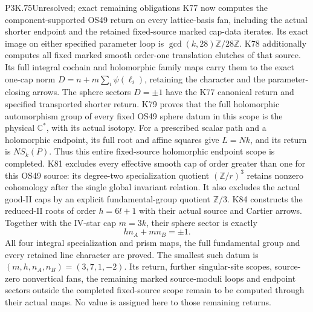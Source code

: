 \begin{statement}{P3K.75}{Unresolved; exact remaining obligations}
K77 now computes the component-supported OS49 return on every
lattice-basis fan, including the actual shorter endpoint and
the retained fixed-source marked cap-data iterates. Its exact
image on either specified parameter loop is
\(\gcd(k,28)\mathbb Z/28\mathbb Z\).
K78 additionally computes all fixed marked smooth order-one
translation clutches of that source. Its full integral cochain
and holomorphic family maps carry them to the exact one-cap norm
\(D=n+m\sum_i\psi(\ell_i)\), retaining the character and the
parameter-closing arrows. The sphere sectors \(D=\pm1\) have the
K77 canonical return and specified transported shorter return.
K79 proves that the full holomorphic automorphism group of every
fixed OS49 sphere datum in this scope is the physical
\(\mathbb C^*\), with its actual isotopy. For a prescribed scalar
path and a holomorphic endpoint, its full root and affine squares
give \(L=Nk\), and its return is \(N S_k(P)\). Thus this entire
fixed-source holomorphic endpoint scope is completed.
K81 excludes every effective smooth cap of order greater than
one for this OS49 source: its degree-two specialization quotient
\((\mathbb Z/r)^3\) retains nonzero cohomology after the single
global invariant relation. It also excludes the actual good-II
caps by an explicit fundamental-group quotient \(\mathbb Z/3\).
K84 constructs the reduced-II roots of order \(h=6l+1\)
with their actual source and Cartier arrows. Together with the
IV-star cap \(m=3k\), their sphere sector is exactly
\[
                 h n_A+m n_B=\pm1.
\]
All four integral specialization and prism maps, the full
fundamental group and every retained line character are proved.
The smallest such datum is \((m,h,n_A,n_B)=(3,7,1,-2)\).
Its return, further singular-site scopes, source-zero nonvertical
fans, the remaining marked source-moduli loops and endpoint
sectors outside the completed fixed-source scope remain to be
computed through their actual maps. No value is assigned here
to those remaining returns.
\end{statement}
